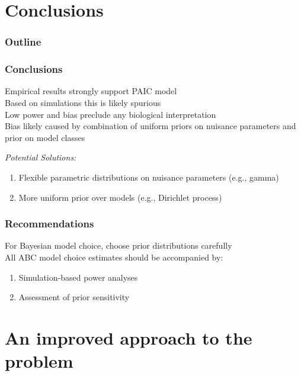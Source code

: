 \section{Conclusions}

\begin{frame}
\frametitle{Outline}
\end{frame}

\begin{frame}
    \frametitle{Conclusions}
    Empirical results strongly support PAIC model \\
    \bigskip
    Based on simulations this is likely spurious \\
    \bigskip
    Low power and bias preclude any biological interpretation \\
    \bigskip
    Bias likely caused by combination of uniform priors on nuisance parameters
    and prior on model classes \\
    \bigskip
    \begin{block}{\it Potential Solutions:}
        \begin{enumerate}
            \item Flexible parametric distributions on nuisance parameters (e.g., gamma)
            \item More uniform prior over models (e.g., Dirichlet process)
        \end{enumerate}
    \end{block}
\end{frame}

\begin{frame}
    \frametitle{Recommendations}
    For Bayesian model choice, choose prior distributions carefully\\
    \bigskip
    All ABC model choice estimates should be accompanied by:
    \begin{enumerate}
        \item Simulation-based power analyses
        \item Assessment of prior sensitivity
    \end{enumerate}
    \medskip
\end{frame}

\section{An improved approach to the problem}

